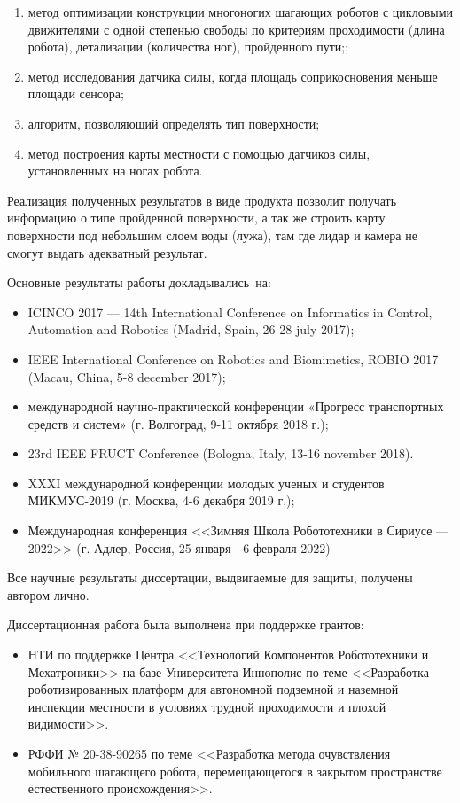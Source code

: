 {}
\begin{enumerate}[beginpenalty=10000] %
  \item метод оптимизации конструкции многоногих шагающих роботов с цикловыми движителями с одной степенью свободы по критериям проходимости (длина робота), детализации (количества ног), пройденного пути;;
  \item метод исследования датчика силы, когда площадь соприкосновения меньше площади сенсора;
  \item алгоритм, позволяющий определять тип поверхности;
  \item метод построения карты местности с помощью датчиков силы, установленных на ногах робота.
\end{enumerate}


{\influence} Реализация полученных результатов в виде продукта позволит получать информацию о типе пройденной поверхности, а так же строить карту поверхности под небольшим слоем воды (лужа), там где лидар и камера не смогут выдать адекватный результат.


{\probation}
Основные результаты работы докладывались~на:
\begin{itemize}
  \item ICINCO 2017 --- 14th International Conference on Informatics in Control, Automation and Robotics (Madrid, Spain, 26-28 july 2017);
  \item IEEE International Conference on Robotics and Biomimetics, ROBIO 2017 (Macau, China, 5-8 december 2017);
  \item  международной  научно-практической  конференции  «Прогресс  транспортных 
  средств и систем» (г. Волгоград, 9-11 октября 2018 г.);
  \item 23rd IEEE FRUCT Conference (Bologna, Italy, 13-16 november 2018).
  \item XXXI международной конференции молодых ученых и студентов МИКМУС-2019 
  (г. Москва, 4-6 декабря 2019 г.);
  \item Международная конференция <<Зимняя Школа Робототехники в Сириусе --- 2022>> (г. Адлер, Россия, 25 января - 6 февраля 2022)
\end{itemize}

{\contribution} Все научные результаты диссертации, выдвигаемые для защиты, получены автором лично.

\ifsynopsis

\fi

Диссертационная работа была выполнена при поддержке грантов:
\begin{itemize}
    \item НТИ по поддержке Центра <<Технологий Компонентов Робототехники и Мехатроники>> на базе Университета Иннополис по теме <<Разработка роботизированных платформ для автономной подземной и наземной инспекции местности в условиях трудной проходимости и плохой видимости>>. 
    \item РФФИ № 20-38-90265 по теме <<Разработка метода очувствления мобильного шагающего робота, перемещающегося в закрытом пространстве естественного происхождения>>.
\end{itemize}

